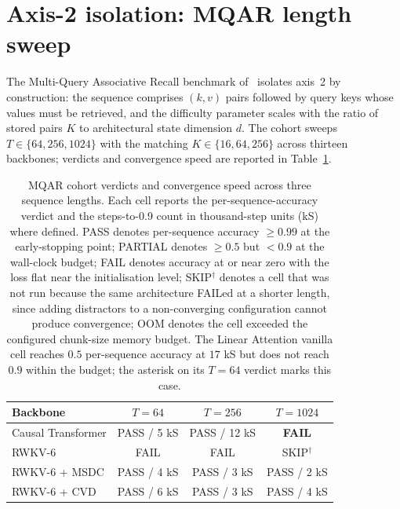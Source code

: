 \section{Axis-2 isolation: MQAR length sweep}\label{sec:experiments:mqar}

The Multi-Query Associative Recall benchmark
of~\citet{arora2023zoology} isolates axis~2 by construction:
the sequence comprises $(k, v)$ pairs followed by query keys
whose values must be retrieved, and the difficulty parameter
scales with the ratio of stored pairs $K$ to architectural
state dimension $d$. The cohort sweeps
$T \in \{64, 256, 1024\}$ with the matching
$K \in \{16, 64, 256\}$ across thirteen backbones; verdicts and
convergence speed are reported in
Table~\ref{tab:results:mqar-cohort}.

\begin{table}[!htbp]
\centering
\small
\caption[MQAR cohort verdicts and convergence speed]{MQAR cohort
verdicts and convergence speed across three sequence lengths.
Each cell reports the per-sequence-accuracy verdict and the
steps-to-0.9 count in thousand-step units (kS) where defined.
PASS denotes per-sequence accuracy $\ge 0.99$ at the
early-stopping point; PARTIAL denotes $\ge 0.5$ but $< 0.9$ at
the wall-clock budget; FAIL denotes accuracy at or near zero
with the loss flat near the initialisation level;
SKIP$^{\dagger}$ denotes a cell that was not run because the
same architecture FAILed at a shorter length, since adding
distractors to a non-converging configuration cannot produce
convergence; OOM denotes the cell exceeded the configured
chunk-size memory budget. The Linear Attention vanilla cell
reaches $0.5$ per-sequence accuracy at $17$ kS but does not
reach $0.9$ within the budget; the asterisk on its $T = 64$
verdict marks this case.}
\label{tab:results:mqar-cohort}
\setlength{\tabcolsep}{6pt}
\renewcommand{\arraystretch}{1.15}
\begin{tabularx}{\linewidth}{@{}X c c c@{}}
\toprule
\textbf{Backbone} & \textbf{$T = 64$} & \textbf{$T = 256$} & \textbf{$T = 1024$} \\
\midrule
Causal Transformer       & PASS / 5 kS  & PASS / 12 kS & \textbf{FAIL} \\
\addlinespace
RWKV-6                   & FAIL          & FAIL          & SKIP$^{\dagger}$ \\
RWKV-6 + MSDC            & PASS / 4 kS  & PASS / 3 kS  & PASS / 2 kS \\
RWKV-6 + CVD             & PASS / 6 kS  & PASS / 3 kS  & PASS / 4 kS \\

\end{tabularx}
\end{table}
